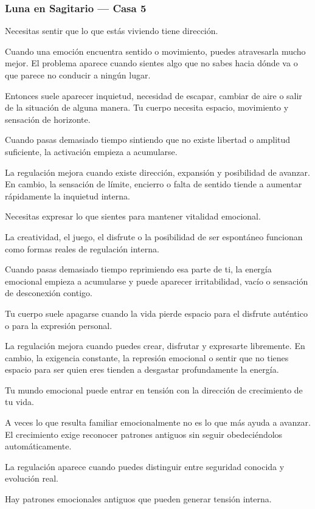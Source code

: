 \documentclass[11pt,a4paper]{article}
\begin{document}
\subsubsection*{Luna en Sagitario — Casa 5}

Necesitas sentir que lo que estás viviendo tiene dirección.

Cuando una emoción encuentra sentido o movimiento, puedes atravesarla mucho mejor. El problema aparece cuando sientes algo que no sabes hacia dónde va o que parece no conducir a ningún lugar.

Entonces suele aparecer inquietud, necesidad de escapar, cambiar de aire o salir de la situación de alguna manera. Tu cuerpo necesita espacio, movimiento y sensación de horizonte.

Cuando pasas demasiado tiempo sintiendo que no existe libertad o amplitud suficiente, la activación empieza a acumularse.

La regulación mejora cuando existe dirección, expansión y posibilidad de avanzar. En cambio, la sensación de límite, encierro o falta de sentido tiende a aumentar rápidamente la inquietud interna.

Necesitas expresar lo que sientes para mantener vitalidad emocional.

La creatividad, el juego, el disfrute o la posibilidad de ser espontáneo funcionan como formas reales de regulación interna.

Cuando pasas demasiado tiempo reprimiendo esa parte de ti, la energía emocional empieza a acumularse y puede aparecer irritabilidad, vacío o sensación de desconexión contigo.

Tu cuerpo suele apagarse cuando la vida pierde espacio para el disfrute auténtico o para la expresión personal.

La regulación mejora cuando puedes crear, disfrutar y expresarte libremente. En cambio, la exigencia constante, la represión emocional o sentir que no tienes espacio para ser quien eres tienden a desgastar profundamente la energía.

Tu mundo emocional puede entrar en tensión con la dirección de crecimiento de tu vida.

A veces lo que resulta familiar emocionalmente no es lo que más ayuda a avanzar. El crecimiento exige reconocer patrones antiguos sin seguir obedeciéndolos automáticamente.

La regulación aparece cuando puedes distinguir entre seguridad conocida y evolución real.

Hay patrones emocionales antiguos que pueden generar tensión interna.
\end{document}
